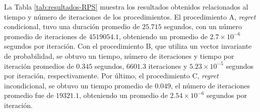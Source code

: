 La Tabla \ref{tab:resultados-RPS} muestra los resultados obtenidos relacionados al tiempo y número de iteraciones de los procedimientos. El procedimiento A, \textit{regret} condicional, tuvo una duración promedio de $25.715$ segundos, con un número promedio de iteraciones de $4519054.1$, obteniendo un promedio de $2.7 {\times} 10^{-6}$ segundos por iteración. Con el procedimiento B, que utiliza un vector invariante de probabilidad, se obtuvo un tiempo, número de iteraciones y tiempo por iteración promedios de $0.345$ segundos, $6601.3$ iteraciones y $5.23 {\times} 10^{-5}$ segundos por iteración, respectivamente. Por último, el procedimiento C, \textit{regret} incondicional, se obtuvo un tiempo promedio de $0.049$, el número de iteraciones promedio fue de $19321.1$, obteniendo un promedio de $2.54 {\times} 10^{-6}$ segundos por iteración.

